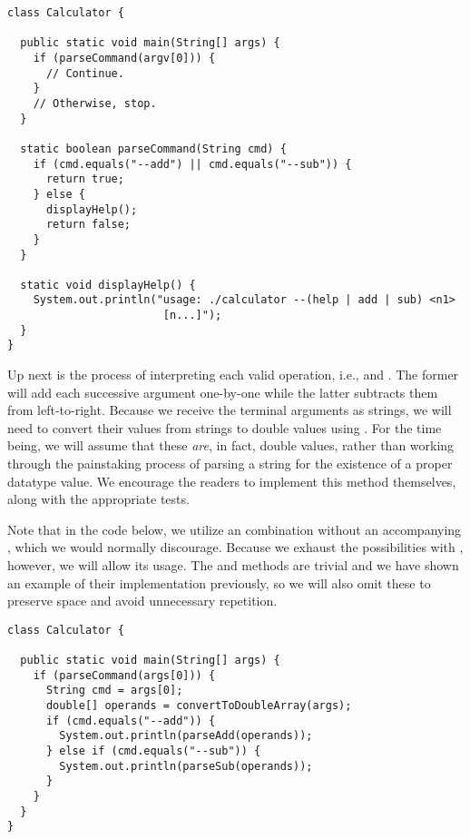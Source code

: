 \begin{lstlisting}[language=MyJava]
class Calculator {

  public static void main(String[] args) {
    if (parseCommand(argv[0])) {
      // Continue.
    }
    // Otherwise, stop.
  }

  static boolean parseCommand(String cmd) {
    if (cmd.equals("--add") || cmd.equals("--sub")) {
      return true;
    } else {
      displayHelp();
      return false;
    }
  }

  static void displayHelp() {
    System.out.println("usage: ./calculator --(help | add | sub) <n1> 
                        [n...]");
  }
}
\end{lstlisting}

Up next is the process of interpreting each valid operation, i.e.,  and . 
The former will add each successive argument one-by-one while the latter subtracts them from left-to-right. 
Because we receive the terminal arguments as strings, we will need to convert their values from strings to double values using . 
For the time being, we will assume that these \emph{are}, in fact, double values, rather than working through the painstaking process of parsing a string for the existence of a proper  datatype value. 
We encourage the readers to implement this method themselves, along with the appropriate tests.

Note that in the code below, we utilize an  combination without an accompanying , which we would normally discourage. 
Because we exhaust the possibilities with , however, we will allow its usage. 
The  and  methods are trivial and we have shown an example of their implementation previously, so we will also omit these to preserve space and avoid unnecessary repetition.

\begin{lstlisting}[language=MyJava]
class Calculator {

  public static void main(String[] args) {
    if (parseCommand(args[0])) {
      String cmd = args[0];
      double[] operands = convertToDoubleArray(args);
      if (cmd.equals("--add")) {
        System.out.println(parseAdd(operands));
      } else if (cmd.equals("--sub")) {
        System.out.println(parseSub(operands));
      }
    }
  }
}
\end{lstlisting}

